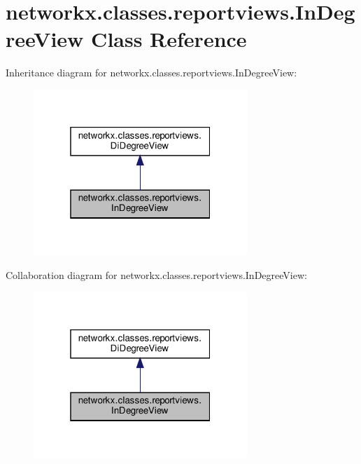 \hypertarget{classnetworkx_1_1classes_1_1reportviews_1_1InDegreeView}{}\section{networkx.\+classes.\+reportviews.\+In\+Degree\+View Class Reference}
\label{classnetworkx_1_1classes_1_1reportviews_1_1InDegreeView}


Inheritance diagram for networkx.\+classes.\+reportviews.\+In\+Degree\+View\+:
\nopagebreak
\begin{figure}[H]
\begin{center}
\leavevmode
\includegraphics[width=229pt]{classnetworkx_1_1classes_1_1reportviews_1_1InDegreeView__inherit__graph}
\end{center}
\end{figure}


Collaboration diagram for networkx.\+classes.\+reportviews.\+In\+Degree\+View\+:
\nopagebreak
\begin{figure}[H]
\begin{center}
\leavevmode
\includegraphics[width=229pt]{classnetworkx_1_1classes_1_1reportviews_1_1InDegreeView__coll__graph}
\end{center}
\end{figure}
